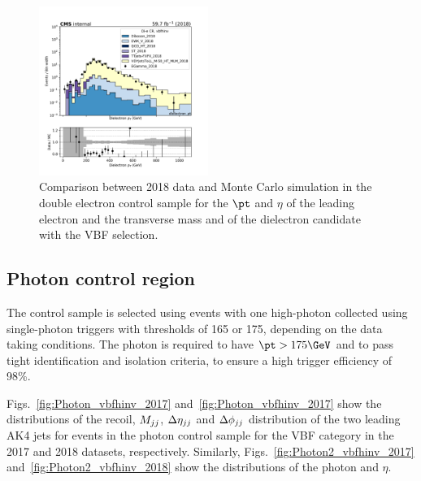 \begin{figure}[htbp]
\begin{center}
        \includegraphics[width=0.49\textwidth]{fig/datamc/cr_2e_vbf/cr_2e_vbf_dielectron_pt_losf_2018.pdf}
    \end{center}
    \caption{Comparison between 2018 data and Monte Carlo simulation in the double electron control sample for
        the $\pt$ and $\eta$ of the leading electron and the transverse mass and \pt of the dielectron candidate with the VBF selection.}
    \label{fig:DE_2_vbfhinv_2018}
\end{figure}

\newpage

\subsection{Photon control region}
\label{sec:selection_cr_g}

The \phojets control sample is selected using events with one high-\pt photon collected using single-photon triggers 
with \pt thresholds of 165 or 175\GeV, depending on the data taking conditions. 
The photon is required to have $\pt > 175\GeV$ and to pass tight identification and isolation criteria, 
to ensure a high trigger efficiency of 98\%. 

Figs.~\ref{fig:Photon_vbfhinv_2017} and~\ref{fig:Photon_vbfhinv_2017} show the distributions of the recoil, $M_{jj}$, $\Delta \eta_{jj}$ and 
$\Delta \phi_{jj}$ distribution of the two leading AK4 jets for events in the photon control sample for the VBF category in the 
2017 and 2018 datasets, respectively. 
Similarly, Figs.~\ref{fig:Photon2_vbfhinv_2017} and~\ref{fig:Photon2_vbfhinv_2018} show the distributions of the photon \pt and $\eta$.

